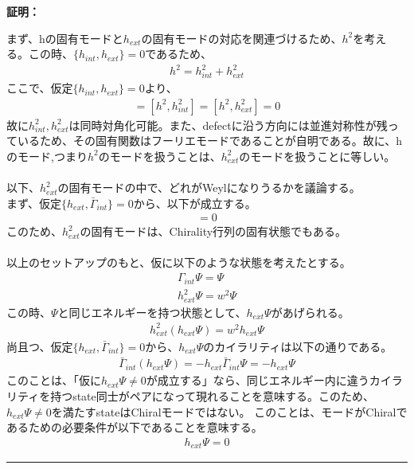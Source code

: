 \documentclass[dvipdfmx,a4paper,10.5pt]{article}
\numberwithin{equation}{section}
\newenvironment{proofbox}
{\begin{prooflabel}\textbf{証明：}\end{prooflabel}\vspace{0.8em}}
{\par\vspace{1em}\hrule\vspace{1em}}
\begin{document}
\begin{proofbox}
    まず、hの固有モードと$h_{ext}$の固有モードの対応を関連づけるため、$h^{2}$を考える。この時、$\{h_{int},h_{ext}\}=0$であるため、
    \begin{gather*}
        h^{2}=h^{2}_{int}+h^{2}_{ext}
    \end{gather*}
    ここで、仮定$\{h_{int},h_{ext}\}=0$より、
    \begin{align*}
        [h^{2}_{int},h_{ext}^{2}]=[h^{2},h_{int}^{2}]=[h^{2},h_{ext}^{2}]=0
    \end{align*}
    故に$h^{2}_{int},h_{ext}^{2}$は同時対角化可能。また、defectに沿う方向には並進対称性が残っているため、その固有関数はフーリエモードであることが自明である。故に、hのモード,つまり$h^{2}$のモードを扱うことは、$h_{ext}^{2}$のモードを扱うことに等しい。\\
    \\
    以下、$h_{ext}^{2}$の固有モードの中で、どれがWeylになりうるかを議論する。\\
    まず、仮定$\{h_{ext},\bar{\Gamma}_{int}\}=0$から、以下が成立する。
    \begin{align*}
        [h_{ext}^{2},\bar{\Gamma}_{int}]=0
    \end{align*}
    このため、$h_{ext}^{2}$の固有モードは、Chirality行列の固有状態でもある。\\
    \\
    以上のセットアップのもと、仮に以下のような状態を考えたとする。
    \begin{align*}
        \Gamma_{int}\Psi=\Psi\\
        h_{ext}^{2}\Psi =w^{2}\Psi
    \end{align*}
    この時、$\Psi$と同じエネルギーを持つ状態として、$h_{ext}\Psi$があげられる。
    \begin{align*}
        h_{ext}^{2}(h_{ext}\Psi)=w^{2}h_{ext}\Psi
    \end{align*}
    尚且つ、仮定$\{h_{ext},\bar{\Gamma}_{int}\}=0$から、$h_{ext}\Psi$のカイラリティは以下の通りである。
    \begin{align*}
        \bar{\Gamma}_{int}(h_{ext}\Psi)=-h_{ext}\bar{\Gamma}_{int}\Psi=-h_{ext}\Psi
    \end{align*}
    このことは、「仮に$h_{ext}\Psi\neq 0$が成立する」なら、同じエネルギー内に違うカイラリティを持つstate同士がペアになって現れることを意味する。このため、$h_{ext}\Psi\neq 0$を満たすstateはChiralモードではない。
    このことは、モードがChiralであるための必要条件が以下であることを意味する。
    \begin{align*}
        h_{ext}\Psi =0
    \end{align*}
\end{proofbox}
\end{document}
